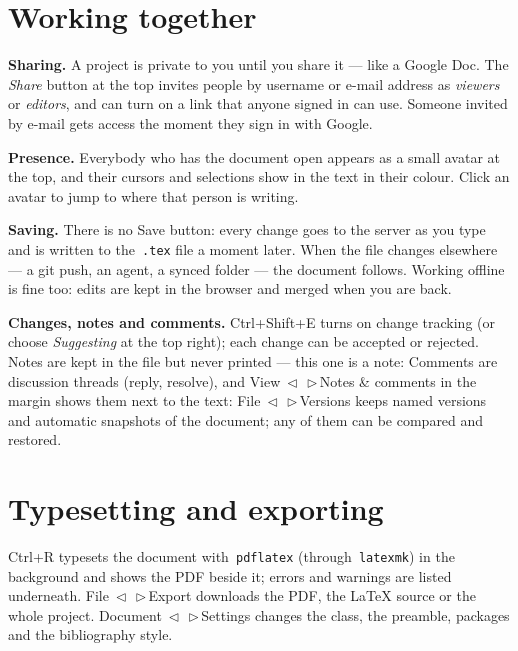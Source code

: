 \documentclass[english]{article}
\makeatletter
\DeclareRobustCommand*{\lyxarrow}{%
\@ifstar
{\leavevmode\,$\triangleleft$\,\allowbreak}
{\leavevmode\,$\triangleright$\,\allowbreak}}
\makeatother
\begin{document}
\section{Working together}\label{sec:collab}

\textbf{Sharing.} A project is private to you until you share it --- like a Google Doc. The \emph{Share} button at the top invites people by username or e-mail address as\emph{ viewers} or \emph{ editors}, and can turn on a link that anyone signed in can use. Someone invited by e-mail gets access the moment they sign in with Google.

\textbf{Presence.} Everybody who has the document open appears as a small avatar at the top, and their cursors and selections show in the text in their colour. Click an avatar to jump to where that person is writing.

\textbf{Saving.} There is no Save button: every change goes to the server as you type and is written to the\texttt{ .tex} file a moment later. When the file changes elsewhere --- a git push, an agent, a synced folder --- the document follows. Working offline is fine too: edits are kept in the browser and merged when you are back.

\textbf{Changes, notes and comments.} \textsf{Ctrl+Shift+E} turns on change tracking (or choose \emph{Suggesting} at the top right); each change can be accepted or rejected. Notes are kept in the file but never printed --- this one is a note: %
Comments are discussion threads (reply, resolve), and View\lyxarrow Notes \& comments in the margin shows them next to the text: %
File\lyxarrow Versions keeps named versions and automatic snapshots of the document; any of them can be compared and restored.

\section{Typesetting and exporting}\label{sec:compile}

\textsf{Ctrl+R} typesets the document with\texttt{ pdflatex} (through\texttt{ latexmk}) in the background and shows the PDF beside it; errors and warnings are listed underneath. File\lyxarrow Export downloads the PDF, the \LaTeX{} source or the whole project. Document\lyxarrow Settings changes the class, the preamble, packages and the bibliography style.
\end{document}
